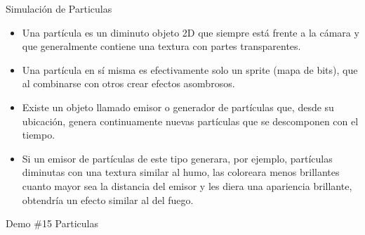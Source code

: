 

\begin{frame}{Simulación de Particulas}
\begin{itemize}
\item Una partícula es un diminuto objeto 2D que siempre está frente a la cámara y que generalmente contiene una textura con partes transparentes. 
\item Una partícula en sí misma es efectivamente solo un sprite (mapa de bits), que al combinarse con otros crear efectos asombrosos.
\item Existe un objeto llamado emisor o generador de partículas que, desde su ubicación, genera continuamente nuevas partículas que se descomponen con el tiempo. 
\item Si un emisor de partículas de este tipo generara, por ejemplo, partículas diminutas con una textura similar al humo, las coloreara menos brillantes cuanto mayor sea la distancia del emisor y les diera una apariencia brillante, obtendría un efecto similar al del fuego. 
\end{itemize}
\begin{block}{Demo \#15}
Particulas
\end{block}
\end{frame}

